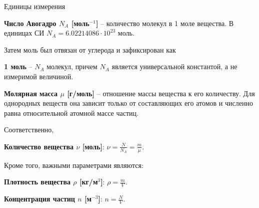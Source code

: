 \documentclass{article}
\newcommand{\definition}[2]{\begin{samepage} \textbf{#1} -- #2. \end{samepage} \par}
\newcommand{\namedequation}[2]{\begin{samepage} \textbf{#1}: $\displaystyle#2$. \end{samepage} \par}
\begin{document}
\begin{section}{Единицы измерения}
		\definition{Число Авогадро $N_A$ [моль$^{-1}$]}{количество молекул в 1 моле вещества. В единицах СИ $N_A = 6.02214086 \cdot 10^{23}$ моль}

		Затем моль был отвязан от углерода и зафиксирован как

		\definition{1 моль}{$N_A$ молекул, причем $N_A$ является универсальной константой, а не измеримой величиной}

		\definition{Молярная масса $\mu$ [г/моль]}{отношение массы вещества к его количеству. Для однородных веществ она зависит только от составляющих его атомов и численно равна относительной атомной массе частиц}

		Соответственно,

		\namedequation{Количество вещества $\nu$ [моль]}{\nu = \frac{N}{N_A} = \frac{m}{\mu}}

		Кроме того, важными параметрами являются:

		\namedequation{Плотность вещества $\rho$ [кг/м$^3$]}{\rho = \frac{m}{V}}

		\namedequation{Концентрация частиц $n$ [м$^{-3}$]}{n = \frac{N}{V}}
	\end{section}
\end{document}
